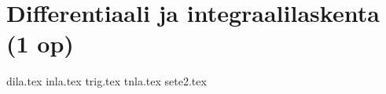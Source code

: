 \documentclass{hyexc}
\begin{document}
\maketitle
\tableofcontents
{}
\part{Differentiaali ja integraalilaskenta (1 op)}
{dila.tex}
\vfill
{inla.tex}
\vfill
{trig.tex}
\vfill
{tnla.tex}
{sete2.tex}
\end{document}
